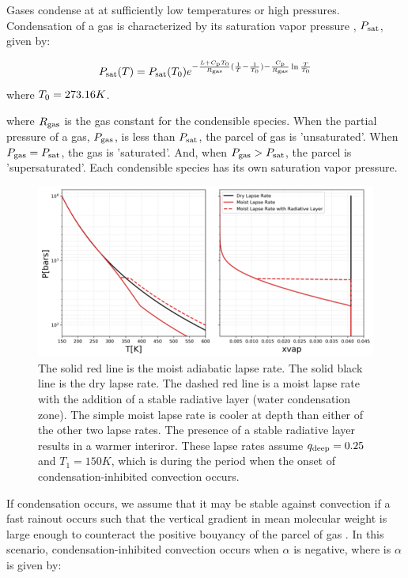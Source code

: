 \documentclass[11pt]{ucscthesisbs}
\begin{document}
Gases condense at at sufficiently low temperatures or high pressures. Condensation of a gas is characterized by its saturation vapor pressure \citep{sanchez_2011}, $P_{\rm sat}$, given by: 

\begin{equation}
  P_{\rm sat}(T) = P_{\rm sat}(T_{\rm 0})e^{-\frac{L + C_{\rm p}T_{\rm 0}}{R_{\rm gas}}(\frac{1}{T} - \frac{1}{T_{\rm 0}}) -\frac{C_{\rm p}}{R_{\rm gas}}\ln{\frac{T}{T_{\rm 0}}}}
  \label{eq:saturation_vapor_pressure}
\end{equation}
where $T_{\rm 0} = 273.16K$.

where $R_{\rm gas}$ is the gas constant for the condensible species. When the partial pressure of a gas, $P_{\rm gas}$, is less than $P_{\rm sat}$, the parcel of gas is 'unsaturated'. When $P_{\rm gas} = P_{\rm sat}$, the gas is 'saturated'. And, when $P_{\rm gas} > P_{\rm sat}$, the parcel is 'supersaturated'. Each condensible species has its own saturation vapor pressure. 

\begin{figure}[ht!]
 \centerline{
  \includegraphics[width=6.5in]{figures/comparison_dry_vs_moist_lapse_rates.png}
 }
\caption[A Standard Interior Structure Model]
{The solid red line is the moist adiabatic lapse rate. The solid black line is the dry lapse rate. The dashed red line is a moist lapse rate with the addition of a stable radiative layer (water condensation zone). The simple moist lapse rate is cooler at depth than either of the other two lapse rates. The presence of a stable radiative layer results in a warmer interiror. These lapse rates assume $q_{\rm deep} = 0.25$ and $T_{1} = 150K$, which is during the period when the onset of condensation-inhibited convection occurs.}
\label{fig:standard_dry_interior}
\end{figure}


If condensation occurs, we assume that it may be stable against convection if a fast rainout occurs such that the vertical gradient in mean molecular weight is large enough to counteract the positive bouyancy of the parcel of gas \citep{leconte_2017} \citep{friedson_2017}. In this scenario, condensation-inhibited convection occurs when $\alpha$ is negative, where is $\alpha$ \citep{friedson_2017} is given by:
\end{document}
